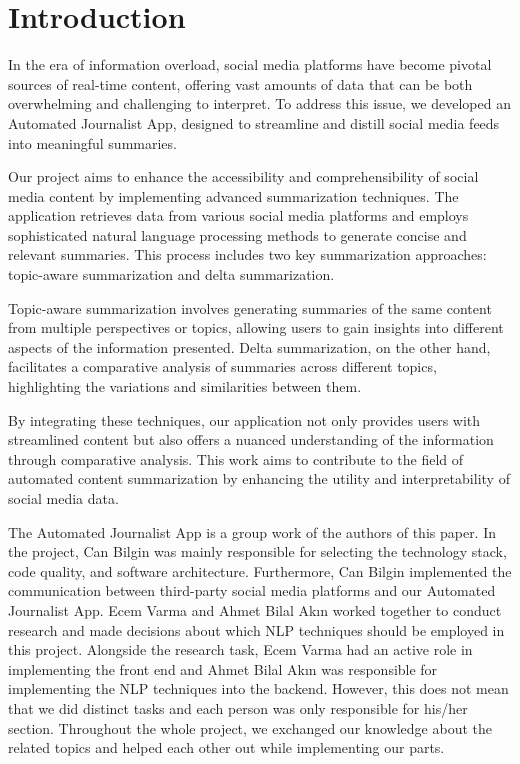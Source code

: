 \section{Introduction}

In the era of information overload, social media platforms have become pivotal sources of real-time content, offering vast amounts of data that can be both overwhelming and challenging to interpret. To address this issue, we developed an Automated Journalist App, designed to streamline and distill social media feeds into meaningful summaries.

Our project aims to enhance the accessibility and comprehensibility of social media content by implementing advanced summarization techniques. The application retrieves data from various social media platforms and employs sophisticated natural language processing methods to generate concise and relevant summaries. This process includes two key summarization approaches: topic-aware summarization and delta summarization.

Topic-aware summarization involves generating summaries of the same content from multiple perspectives or topics, allowing users to gain insights into different aspects of the information presented. Delta summarization, on the other hand, facilitates a comparative analysis of summaries across different topics, highlighting the variations and similarities between them.

By integrating these techniques, our application not only provides users with streamlined content but also offers a nuanced understanding of the information through comparative analysis. This work aims to contribute to the field of automated content summarization by enhancing the utility and interpretability of social media data.

The Automated Journalist App is a group work of the authors of this paper. In the project, Can Bilgin was mainly responsible for selecting the technology stack, code quality, and software architecture. Furthermore, Can Bilgin implemented the communication between third-party social media platforms and our Automated Journalist App. Ecem Varma and Ahmet Bilal Akın worked together to conduct research and made decisions about which NLP techniques should be employed in this project. Alongside the research task, Ecem Varma had an active role in implementing the front end and Ahmet Bilal Akın was responsible for implementing the NLP techniques into the backend. However, this does not mean that we did distinct tasks and each person was only responsible for his/her section. Throughout the whole project, we exchanged our knowledge about the related topics and helped each other out while implementing our parts.  